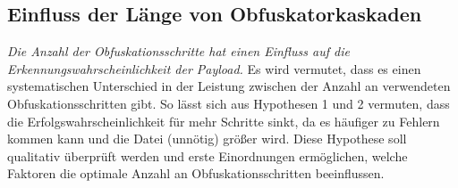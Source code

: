 \subsection{Einfluss der Länge von Obfuskatorkaskaden}
\textit{Die Anzahl der Obfuskationsschritte hat einen Einfluss auf die Erkennungswahrscheinlichkeit der Payload.} Es wird vermutet, dass es einen systematischen Unterschied in der Leistung zwischen der Anzahl an verwendeten Obfuskationsschritten gibt. So lässt sich aus Hypothesen 1 und 2 vermuten, dass die Erfolgswahrscheinlichkeit für mehr Schritte sinkt, da es häufiger zu Fehlern kommen kann und die Datei (unnötig) größer wird. Diese Hypothese soll qualitativ überprüft werden und erste Einordnungen ermöglichen, welche Faktoren die optimale Anzahl an Obfuskationsschritten beeinflussen.
